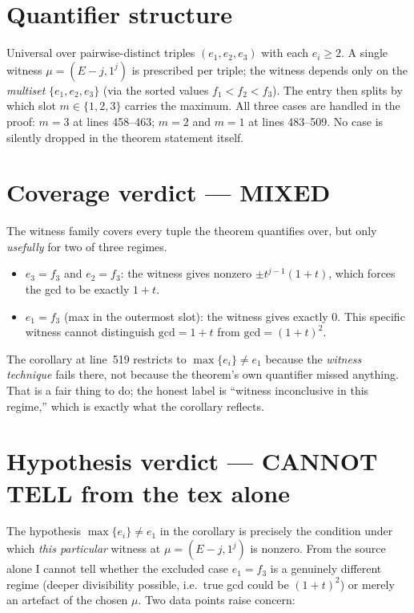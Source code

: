 \documentclass[11pt]{amsart}
\begin{document}
\section{Quantifier structure}

Universal over pairwise-distinct triples $(e_1, e_2, e_3)$ with each $e_i \ge 2$.
A single witness $\mu = (E-j, 1^j)$ is prescribed per triple; the witness
depends only on the \emph{multiset} $\{e_1, e_2, e_3\}$ (via the sorted
values $f_1 < f_2 < f_3$). The entry then splits by which slot
$m \in \{1,2,3\}$ carries the maximum. All three cases are handled in the
proof: $m = 3$ at lines 458--463; $m = 2$ and $m = 1$ at lines 483--509.
No case is silently dropped in the theorem statement itself.

\section{Coverage verdict --- MIXED}

The witness family covers every tuple the theorem quantifies over, but only
\emph{usefully} for two of three regimes.
\begin{itemize}[leftmargin=1.5em]
    \item $e_3 = f_3$ and $e_2 = f_3$: the witness gives nonzero
    $\pm t^{j-1}(1+t)$, which forces the gcd to be exactly $1+t$.
    \item $e_1 = f_3$ (max in the outermost slot): the witness gives
    exactly $0$. This specific witness cannot distinguish
    $\text{gcd} = 1+t$ from $\text{gcd} = (1+t)^2$.
\end{itemize}

The corollary at line~519 restricts to $\max\{e_i\} \ne e_1$ because the
\emph{witness technique} fails there, not because the theorem's own
quantifier missed anything. That is a fair thing to do; the honest label
is ``witness inconclusive in this regime,'' which is exactly what the
corollary reflects.

\section{Hypothesis verdict --- CANNOT TELL from the tex alone}

The hypothesis $\max\{e_i\} \ne e_1$ in the corollary is precisely the
condition under which \emph{this particular} witness at $\mu = (E-j, 1^j)$
is nonzero. From the source alone I cannot tell whether the excluded case
$e_1 = f_3$ is a genuinely different regime (deeper divisibility possible,
i.e.\ true gcd could be $(1+t)^2$) or merely an artefact of the chosen
$\mu$. Two data points raise concern:
\end{document}
